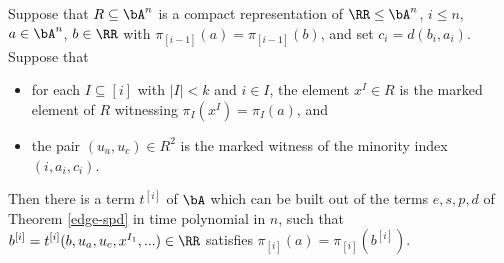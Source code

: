 \begin{lem}\label{compact-rep-filter} Suppose that $R \subseteq \bA^n$ is a compact representation of $\RR \le \bA^n$, $i \le n$, $a \in \bA^n$, $b \in \RR$ with $\pi_{[i-1]}(a) = \pi_{[i-1]}(b)$, and set $c_i = d(b_i, a_i)$. Suppose that
\begin{itemize}
\item for each $I \subseteq [i]$ with $|I| < k$ and $i \in I$, the element $x^I \in R$ is the marked element of $R$ witnessing $\pi_I(x^I) = \pi_I(a)$, and

\item the pair $(u_a,u_c) \in R^2$ is the marked witness of the minority index $(i,a_i,c_i)$.
\end{itemize}
Then there is a term $t^{[i]}$ of $\bA$ which can be built out of the terms $e,s,p,d$ of Theorem \ref{edge-spd} in time polynomial in $n$, such that $b^{[i]} = t^{[i]}(b,u_a,u_c,x^{I_1}, ...) \in \RR$ satisfies $\pi_{[i]}(a) = \pi_{[i]}(b^{[i]})$.
\end{lem}
